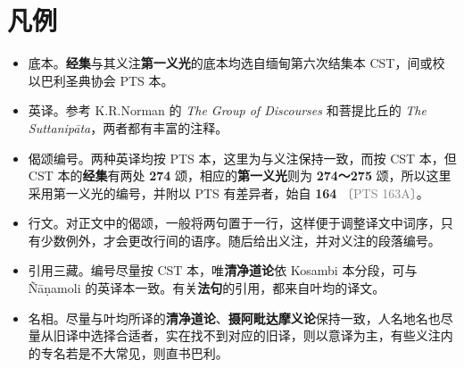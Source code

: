 \chapter{凡例}

\begin{itemize}
    \item 底本。\textbf{经集}与其义注\textbf{第一义光}的底本均选自缅甸第六次结集本 CST，间或校以巴利圣典协会 PTS 本。
    \item 英译。参考 K.R.Norman 的 \textit{The Group of Discourses} 和菩提比丘的 \textit{The Suttanipāta}，两者都有丰富的注释。
    \item 偈颂编号。两种英译均按 PTS 本，这里为与义注保持一致，而按 CST 本，但 CST 本的\textbf{经集}有两处 \textbf{274} 颂，相应的\textbf{第一义光}则为 \textbf{274～275} 颂，所以这里采用第一义光的编号，并附以 PTS 有差异者，始自 \textbf{164} \textcolor{gray}{\footnotesize 〔PTS 163A〕}。
    \item 行文。对正文中的偈颂，一般将两句置于一行，这样便于调整译文中词序，只有少数例外，才会更改行间的语序。随后给出义注，并对义注的段落编号。
    \item 引用三藏。编号尽量按 CST 本，唯\textbf{清净道论}依 Kosambi 本分段，可与 Ñāṇamoli 的英译本一致。有关\textbf{法句}的引用，都来自叶均的译文。
    \item 名相。尽量与叶均所译的\textbf{清净道论}、\textbf{摄阿毗达摩义论}保持一致，人名地名也尽量从旧译中选择合适者，实在找不到对应的旧译，则以意译为主，有些义注内的专名若是不大常见，则直书巴利。
\end{itemize}
